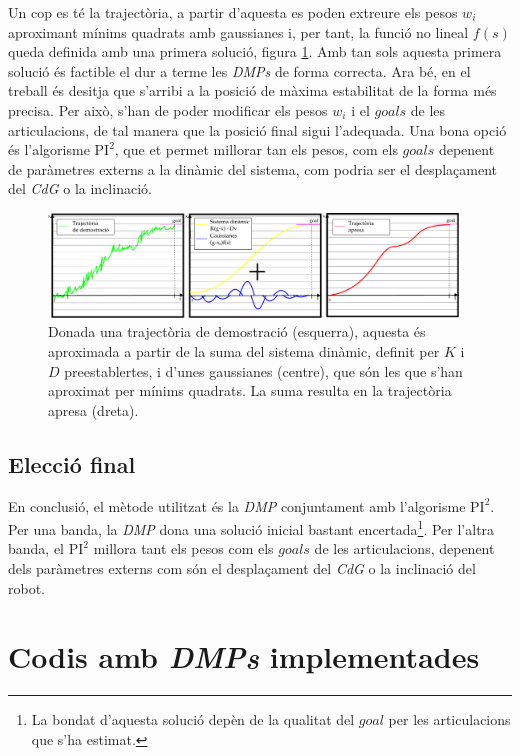 \documentclass[12pt,a4paper,final,twoside]{report}
\begin{document}
Un cop es té la trajectòria, a partir d'aquesta es poden extreure els pesos $w_i$ aproximant mínims quadrats amb gaussianes i, per tant, la funció no lineal $f(s)$ queda definida amb una primera solució, figura \ref{fig:LdF-trajectories}. Amb tan sols aquesta primera solució és factible el dur a terme les \textit{DMPs} de forma correcta. Ara bé, en el treball és desitja que s'arribi a la posició de màxima estabilitat de la forma més precisa. Per això, s'han de poder modificar els pesos $w_i$ i el $goals$ de les articulacions, de tal manera que la posició final sigui l'adequada. Una bona opció és l'algorisme $\mathrm{PI^2}$, que et permet millorar tan els pesos, com els $goals$ depenent de paràmetres externs a la dinàmic del sistema, com podria ser el desplaçament del \textit{CdG} o la inclinació. 
\begin{figure}[tb]
\centering
\includegraphics[width=0.97\textwidth]{Imatges/Aprenentatge-per-demostracio.pdf}
\caption[\textit{DMP} a partir una trajectòria de demostració]{Donada una trajectòria de demostració (esquerra), aquesta és aproximada a partir de la suma del sistema dinàmic, definit per $K$ i $D$ preestablertes, i d'unes gaussianes (centre), que són les que s'han aproximat per mínims quadrats. La suma resulta en la trajectòria apresa (dreta).}
\label{fig:LdF-trajectories}
\end{figure}

\subsection{Elecció final}
En conclusió, el mètode utilitzat és la \textit{DMP} conjuntament amb l'algorisme $\mathrm{PI^2}$. Per una banda, la \textit{DMP} dona una solució inicial bastant encertada\footnote{La bondat d'aquesta solució depèn de la qualitat del $goal$ per les articulacions que s'ha estimat.}. Per l'altra banda, el $\mathrm{PI^2}$ millora tant els pesos com els $goals$ de les articulacions, depenent dels paràmetres externs com són el desplaçament del \textit{CdG} o la inclinació del robot.


\section{Codis amb \textit{DMPs} implementades}
\label{codis-amb-DMPs-implementades}
\end{document}
